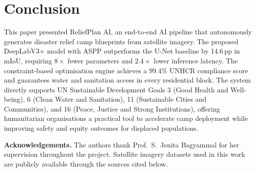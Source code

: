 \documentclass[twocolumn]{article}
\begin{document}
\section{Conclusion}
\label{sec:conclusion}

This paper presented ReliefPlan AI, an end-to-end AI pipeline that autonomously generates disaster
relief camp blueprints from satellite imagery.
The proposed DeepLabV3+ model with ASPP outperforms the U-Net baseline by 14.6\,pp in mIoU,
requiring $8{\times}$ fewer parameters and $2.4{\times}$ lower inference latency.
The constraint-based optimisation engine achieves a 99.4\% UNHCR compliance score and guarantees
water and sanitation access in every residential block.
The system directly supports UN Sustainable Development Goals 3 (Good Health and Well-being),
6 (Clean Water and Sanitation), 11 (Sustainable Cities and Communities), and 16 (Peace, Justice
and Strong Institutions), offering humanitarian organisations a practical tool to accelerate camp
deployment while improving safety and equity outcomes for displaced populations.

\vspace{6pt}
\noindent\textbf{Acknowledgements.}
The authors thank Prof.\ S.\ Jenita Bagyammal for her supervision throughout the project.
Satellite imagery datasets used in this work are publicly available through the sources cited below.
\end{document}

